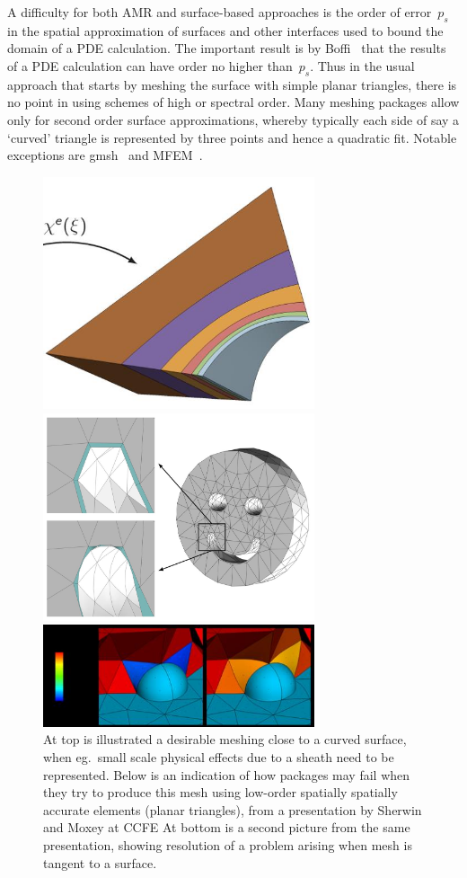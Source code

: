 A difficulty for both AMR and surface-based approaches is the order of error~$p_s$ in the spatial approximation of
surfaces and other interfaces used to bound the domain of a PDE calculation.
The important result is by Boffi~\cite{Bo12Infl} that
the results of a PDE calculation can have order no higher than~$p_s$. Thus in the
usual approach that starts by meshing the surface with simple planar triangles, there is
no point in using schemes of high or spectral order. Many  meshing packages allow only for
second order surface approximations, whereby typically each side of say a `curved' triangle is 
represented by three points and hence a quadratic fit. Notable exceptions
are gmsh~\cite{Ge09gmsh} and MFEM~\cite{Do20hrad,mfemwebsite}.

\begin{figure}
\centerline{\includegraphics[width=8cm]{../png/shmo-754}}
\centerline{\includegraphics[width=8cm]{../png/shmo-672}}
\centerline{\includegraphics[width=8cm]{../png/shmo-681}}
\caption{At top is illustrated a desirable meshing close to a curved surface, when eg.\ small
scale physical effects due to a sheath need to be represented. Below is an indication
of how packages may fail when they try to produce this mesh using low-order spatially
spatially accurate elements (planar triangles), from a presentation by Sherwin and Moxey
at CCFE\label{fig:meshprob}
At bottom is a second picture from the same presentation, showing resolution
of a problem arising when mesh is tangent to a surface.}
\end{figure}

